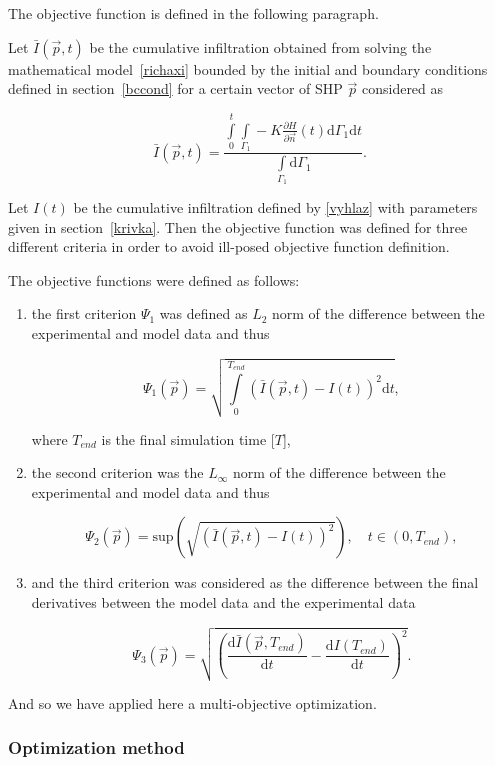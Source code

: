 \documentclass[review]{myarticle}
\newenvironment{lineq}
    {\begin{linenomath*}
    \begin{equation}
    }
    { 
    \end{equation} 
    \end{linenomath*}
    }
\newcommand{\dd}{\mathrm{d}}
\begin{document}
The objective function is defined in the following paragraph.


Let $\bar{I}(\vec{p},t)$ be the cumulative infiltration obtained from solving the mathematical model~\eqref{richaxi} bounded by the initial and boundary conditions  defined in section~\ref{bccond} for a certain vector of SHP $\vec{p}$ considered as
\begin{lineq}\bar{I}(\vec{p},t) = \frac{\int\limits_0^t \int\limits_{\Gamma_1}-K \frac{\partial H}{\partial \vec{n}}(t)  \dd \Gamma_1 \dd t}{\int\limits_{\Gamma_1} \dd \Gamma_1}.\end{lineq}
Let $I(t)$ be the cumulative infiltration defined by \eqref{vyhlaz} with parameters given in section~\ref{krivka}. 
Then the objective function was defined for three different criteria in order to avoid ill-posed objective function definition.

The objective functions were defined as follows:
\begin{enumerate}
\item the first criterion $\Psi_1$ was defined as $L_2$ norm of the difference between the  experimental and model data and thus
\begin{lineq}
\label{objektiva1}
\Psi_1 (\vec{p}) = \sqrt{\int\limits_0^{T_{end}} \left( \bar{I}(\vec{p},t) - I(t) \right)^2 \dd t},
\end{lineq}
where $T_{end}$ is the final simulation time [$T$],
\item the second criterion was the $L_{\infty}$ norm of the difference between the experimental and model data and thus
\begin{lineq}
\label{objektiva2}
\Psi_2 (\vec{p}) = \mathrm{sup} \left( \sqrt{\left( \bar{I}(\vec{p},t) - I(t) \right)^2} \right), \quad  t \in (0, T_{end}),
\end{lineq}
\item and the third criterion was considered as the difference between the final derivatives between the model data and the experimental data
\begin{lineq}
\label{objektiva3}
\Psi_3 (\vec{p}) =  \sqrt{\left( \frac{\dd \bar{I}(\vec{p},T_{end})}{\dd t} - \frac{\dd I(T_{end})}{\dd t} \right)^2}.
\end{lineq}
\end{enumerate}
And so we have applied here a multi-objective optimization.



\subsubsection{Optimization method}%
\label{optima}
\end{document}
